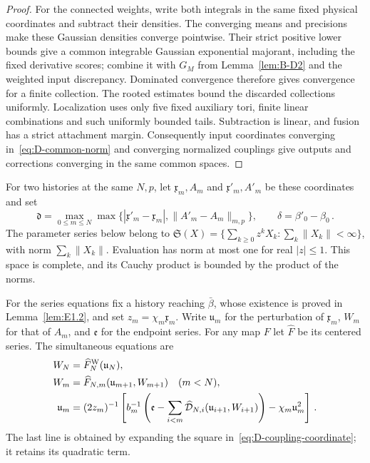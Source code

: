 \begin{proof}
For the connected weights, write both integrals in the same fixed physical coordinates and subtract their densities. The converging means and precisions make these Gaussian densities converge pointwise. Their strict positive lower bounds give a common integrable Gaussian exponential majorant, including the fixed derivative scores; combine it with $G_M$ from Lemma~\ref{lem:B-D2} and the weighted input discrepancy. Dominated convergence therefore gives convergence for a finite collection. The rooted estimates bound the discarded collections uniformly. Localization uses only five fixed auxiliary tori, finite linear combinations and such uniformly bounded tails. Subtraction is linear, and fusion has a strict attachment margin. Consequently input coordinates converging in~\eqref{eq:D-common-norm} and converging normalized couplings give outputs and corrections converging in the same common spaces.
\end{proof}

For two histories at the same $N,p$, let $\mathfrak x_m,A_m$ and $\mathfrak x'_m,A'_m$ be these coordinates and set
\begin{equation}\label{eq:D-history-distance}
\mathfrak d=\max_{0\le m\le N}\max\{|\mathfrak x'_m-\mathfrak x_m|,\|A'_m-A_m\|_{m,p}\},
\qquad \delta=\beta'_0-\beta_0\,.
\end{equation}
The parameter series below belong to $\mathfrak S(X)=\{\sum_{k\ge0}z^kX_k:\sum_k\|X_k\|<\infty\}$, with norm $\sum_k\|X_k\|$. Evaluation has norm at most one for real $|z|\le1$. This space is complete, and its Cauchy product is bounded by the product of the norms.

For the series equations fix a history reaching $\bar\beta$, whose existence is proved in Lemma~\ref{lem:E1.2}, and set $z_m=\chi_m\mathfrak x_m$. Write $\mathfrak u_m$ for the perturbation of $\mathfrak x_m$, $W_m$ for that of $A_m$, and $\mathfrak e$ for the endpoint series. For any map $F$ let $\widehat F$ be its centered series. The simultaneous equations are
\begin{align}\label{eq:D-series-map}
W_N&=\widehat F_N^{\rm W}(\mathfrak u_N),\notag\\
W_m&=\widehat F_{N,m}(\mathfrak u_{m+1},W_{m+1})\quad(m<N),\notag\\
\mathfrak u_m&=(2z_m)^{-1}\left[b_m^{-1}
\left(\mathfrak e-\sum_{i<m}\widehat{\mathcal D}_{N,i}(\mathfrak u_{i+1},W_{i+1})\right)-\chi_m \mathfrak u_m^2\right]\,.
\end{align}
The last line is obtained by expanding the square in~\eqref{eq:D-coupling-coordinate}; it retains its quadratic term.

